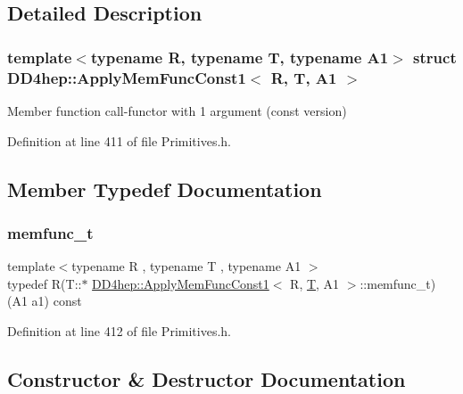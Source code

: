 \subsection{Detailed Description}
\subsubsection*{template$<$typename R, typename T, typename A1$>$\newline
struct D\+D4hep\+::\+Apply\+Mem\+Func\+Const1$<$ R, T, A1 $>$}

Member function call-\/functor with 1 argument (const version) 

Definition at line 411 of file Primitives.\+h.



\subsection{Member Typedef Documentation}
\hypertarget{struct_d_d4hep_1_1_apply_mem_func_const1_ac708abd841ccaac1d1f920a5139b68ce}{}\label{struct_d_d4hep_1_1_apply_mem_func_const1_ac708abd841ccaac1d1f920a5139b68ce} 
\subsubsection{\texorpdfstring{memfunc\+\_\+t}{memfunc\_t}}
{\footnotesize\ttfamily template$<$typename R , typename T , typename A1 $>$ \\
typedef R(T\+::$\ast$ \hyperlink{struct_d_d4hep_1_1_apply_mem_func_const1}{D\+D4hep\+::\+Apply\+Mem\+Func\+Const1}$<$ R, \hyperlink{class_t}{T}, A1 $>$\+::memfunc\+\_\+t) (A1 a1) const}



Definition at line 412 of file Primitives.\+h.



\subsection{Constructor \& Destructor Documentation}
\hypertarget{struct_d_d4hep_1_1_apply_mem_func_const1_a57b70099e8c5677710a247320b79c91c}{}\label{struct_d_d4hep_1_1_apply_mem_func_const1_a57b70099e8c5677710a247320b79c91c} 
